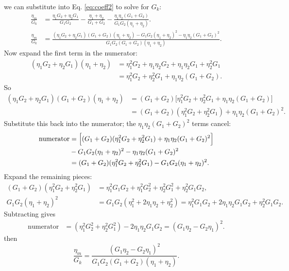 we can substitute into Eq. \ref{eq:coeff2} to solve for $G_k$:
\begin{align*}
	\frac{\eta_m}{G_k}
	&=
	\frac{\eta_1 G_2 + \eta_2 G_1}{G_1G_2}
	-\frac{\eta_1+\eta_2}{G_1+G_2}
	-\frac{\eta_1\eta_2(G_1+G_2)}{G_1G_2(\eta_1+\eta_2)}.
	\\
	\frac{\eta_m}{G_k}
	&=
	\frac{
	(\eta_1G_2+\eta_2G_1)(G_1+G_2)(\eta_1+\eta_2)
	- G_1G_2(\eta_1+\eta_2)^2
	- \eta_1\eta_2(G_1+G_2)^2
	}{
	G_1G_2(G_1+G_2)(\eta_1+\eta_2)
	}.
\end{align*}
Now expand the first term in the numerator:
\begin{align*}
	(\eta_1G_2+\eta_2G_1)(\eta_1+\eta_2)
	&=
	\eta_1^2G_2 + \eta_1\eta_2G_2 + \eta_1\eta_2G_1 + \eta_2^2G_1 \\
	&=
	\eta_1^2G_2 + \eta_2^2G_1 + \eta_1\eta_2(G_1+G_2).
\end{align*}
So
\begin{align*}
	(\eta_1G_2+\eta_2G_1)(G_1+G_2)(\eta_1+\eta_2)
	&=
	(G_1+G_2)\bigl[\eta_1^2G_2 + \eta_2^2G_1 + \eta_1\eta_2(G_1+G_2)\bigr] \\
	&=
	(G_1+G_2)(\eta_1^2G_2 + \eta_2^2G_1) + \eta_1\eta_2(G_1+G_2)^2.
\end{align*}
Substitute this back into the numerator; the $\eta_1\eta_2(G_1+G_2)^2$ terms cancel:
\begin{align*}
	\text{numerator}
	&=
	\Bigl[(G_1+G_2)(\eta_1^2G_2 + \eta_2^2G_1) + \eta_1\eta_2(G_1+G_2)^2\Bigr]\\
	&- G_1G_2(\eta_1+\eta_2)^2
	- \eta_1\eta_2(G_1+G_2)^2 \\
	&=
	(G_1+G_2)(\eta_1^2G_2 + \eta_2^2G_1) - G_1G_2(\eta_1+\eta_2)^2.
\end{align*}
Expand the remaining pieces:
\begin{align*}
	(G_1+G_2)(\eta_1^2G_2 + \eta_2^2G_1)
	&=
	\eta_1^2G_1G_2 + \eta_1^2G_2^2 + \eta_2^2G_1^2 + \eta_2^2G_1G_2, \\
	G_1G_2(\eta_1+\eta_2)^2
	&=
	G_1G_2(\eta_1^2 + 2\eta_1\eta_2 + \eta_2^2)
	=
	\eta_1^2G_1G_2 + 2\eta_1\eta_2G_1G_2 + \eta_2^2G_1G_2.
\end{align*}
Subtracting gives
\begin{align*}
	\text{numerator}
	&=
	(\eta_1^2G_2^2 + \eta_2^2G_1^2) - 2\eta_1\eta_2G_1G_2
	=
	(G_1\eta_2 - G_2\eta_1)^2.
\end{align*}
then
\begin{equation*}
	\frac{\eta_m}{G_k}
	=
	\frac{(G_1\eta_2 - G_2\eta_1)^2}{G_1G_2(G_1+G_2)(\eta_1+\eta_2)}.
\end{equation*}

